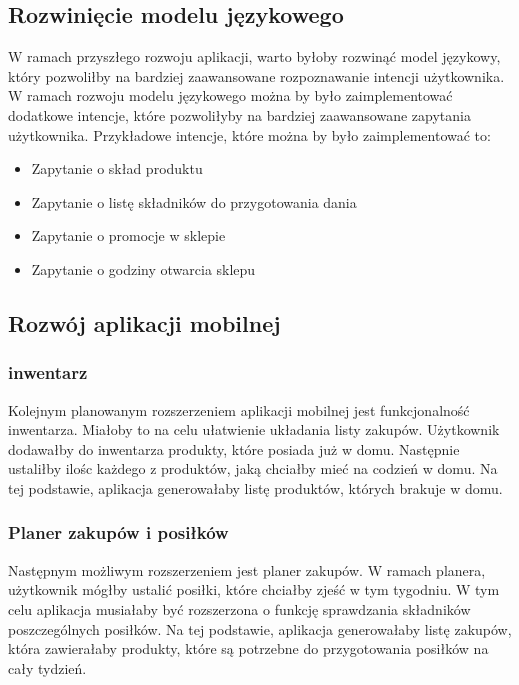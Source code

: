\subsection{Rozwinięcie modelu językowego}
W ramach przyszłego rozwoju aplikacji, warto byłoby rozwinąć model językowy, który pozwoliłby na bardziej zaawansowane rozpoznawanie intencji użytkownika. W ramach rozwoju modelu językowego można by było zaimplementować dodatkowe intencje, które pozwoliłyby na bardziej zaawansowane zapytania użytkownika. Przykładowe intencje, które można by było zaimplementować to:
\begin{itemize}
    \item Zapytanie o skład produktu
    \item Zapytanie o listę składników do przygotowania dania
    \item Zapytanie o promocje w sklepie
    \item Zapytanie o godziny otwarcia sklepu
\end{itemize}


\subsection{Rozwój aplikacji mobilnej}

\subsubsection{inwentarz}

Kolejnym planowanym rozszerzeniem aplikacji mobilnej jest funkcjonalność inwentarza. Miałoby to na celu ułatwienie układania listy zakupów. Użytkownik dodawałby do inwentarza produkty, które posiada już w domu. Następnie ustaliłby ilośc każdego z produktów, jaką chciałby mieć na codzień w domu.
Na tej podstawie, aplikacja generowałaby listę produktów, których brakuje w domu. 

\subsubsection{Planer zakupów i posiłków}

Następnym możliwym rozszerzeniem jest planer zakupów. W ramach planera, użytkownik mógłby ustalić posiłki, które chciałby zjeść w tym tygodniu. W tym celu aplikacja musiałaby być rozszerzona o funkcję sprawdzania składników poszczególnych posiłków. Na tej podstawie, aplikacja generowałaby listę zakupów, która zawierałaby produkty, które są potrzebne do przygotowania posiłków na cały tydzień.

